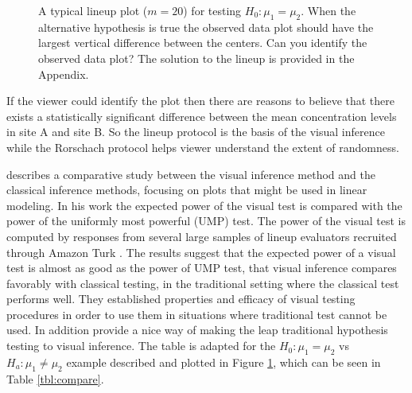 \documentclass[12]{article}
\begin{document}
\begin{figure}[hbtp]
   \centering
      \caption{A typical lineup plot ($m = 20$) for testing $H_0: \mu_1 =  \mu_2$. 
      When the alternative hypothesis is true the observed data plot should have the largest vertical difference between the centers. Can you identify the observed data plot? The solution to the lineup is provided in the Appendix.}
      \label{lineup}
\end{figure}


If the viewer could identify the plot then there are reasons to believe that there exists a statistically significant difference between the mean concentration levels in site A and site B. So the lineup protocol is the basis of the visual inference while the Rorschach protocol helps viewer understand the extent of randomness. 

\cite{majumder:2011} describes a comparative study between the visual inference method and the classical inference methods, focusing on plots that might be used in linear modeling. In his work the expected power of the visual test is compared with the power of the uniformly most powerful (UMP) test. The power of the visual test is computed by responses from several large samples of lineup evaluators recruited through Amazon Turk \citep{turk}. The results suggest that the expected power of a visual test is almost as good as the power of UMP test, that visual inference compares favorably with classical testing, in the traditional setting where the classical test performs well. They established properties and efficacy of visual testing procedures in order to use them in situations where traditional test cannot be used. In addition \cite{majumder:2011} provide a nice way of making the leap traditional hypothesis testing to visual inference. The table is adapted for the $H_0: \mu_1 =  \mu_2$ vs $H_a: \mu_1 \ne \mu_2$ example described and plotted in Figure \ref{lineup}, which can be seen in Table \ref{tbl:compare}.
\end{document}
